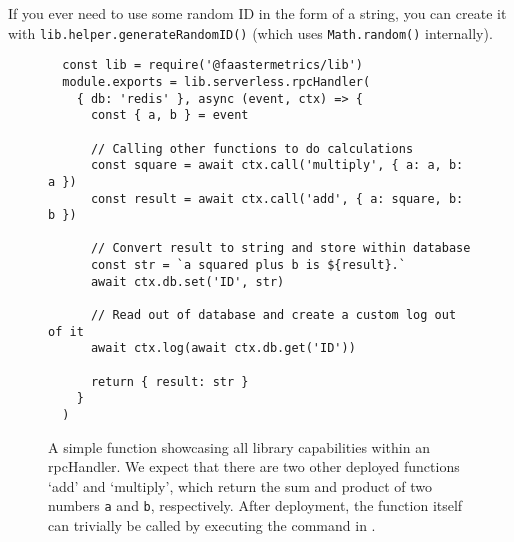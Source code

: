 \documentclass[../main.tex]{subfiles}
\begin{document}
If you ever need to use some random ID in the form of a string,
you can create it with \texttt{lib.helper.generateRandomID()} (which uses \texttt{Math.random()} internally).

\begin{figure}
\begin{tcolorbox}
\begin{verbatim}
  const lib = require('@faastermetrics/lib')
  module.exports = lib.serverless.rpcHandler(
    { db: 'redis' }, async (event, ctx) => {
      const { a, b } = event
  
      // Calling other functions to do calculations
      const square = await ctx.call('multiply', { a: a, b: a })
      const result = await ctx.call('add', { a: square, b: b })
  
      // Convert result to string and store within database
      const str = `a squared plus b is ${result}.`
      await ctx.db.set('ID', str)

      // Read out of database and create a custom log out of it
      await ctx.log(await ctx.db.get('ID'))

      return { result: str }
    }
  )
\end{verbatim}
\end{tcolorbox}
\caption{%
  A simple function showcasing all library capabilities within an rpcHandler.
  We expect that there are two other deployed functions `add' and `multiply',
  which return the sum and product of two numbers \texttt{a} and \texttt{b}, respectively.
  After deployment, the function itself can trivially be called by executing the command in .
}%
\label{fig:rpcHandlerFullFunctionalityExample}
\end{figure}
\end{document}

